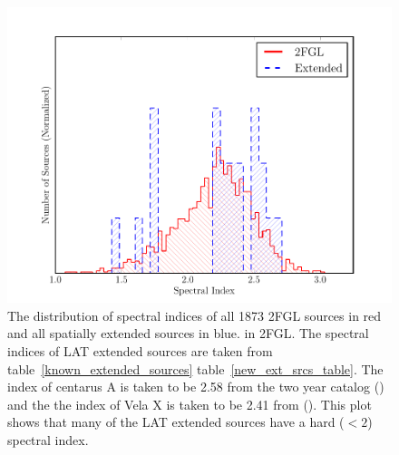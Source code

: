 \documentclass[12pt,preprint]{aastex}
\begin{document}
\clearpage
\begin{figure}
  \begin{center}
    \includegraphics{summary_plots/compare_index_2FGL.pdf}
    \end{center}
    \caption{
    The distribution of spectral indices of all 1873 2FGL sources in
    red and all spatially extended sources in blue.  in 2FGL. The
    spectral indices of LAT extended sources are taken from
    table~\ref{known_extended_sources} table~\ref{new_ext_srcs_table}.
    The index of centarus A is taken to be 2.58 from the two year catalog
    (\cite{second_cat}) and the the index of Vela X is taken to be 2.41
    from (\cite{velax}). This plot shows that many of the LAT
    extended sources have a hard ($<2$) spectral index.
    }\label{compare_index_2FGL}
  \end{figure}
\end{document}
